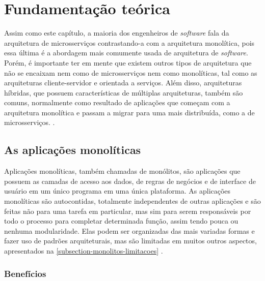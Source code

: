 \chapter{Fundamentação teórica}\label{chapter-fundamentacao}



Assim como este capítulo, a maioria dos engenheiros de \emph{software} fala da arquitetura de microsserviços contrastando-a com a arquitetura monolítica, pois essa última é a abordagem mais comumente usada de arquitetura de \emph{software}. Porém, é importante ter em mente que existem outros tipos de arquitetura que não se encaixam nem como de microsserviços nem como monolíticas, tal como as arquiteturas cliente-servidor e orientada a serviços. Além disso, arquiteturas híbridas, que possuem características de múltiplas arquiteturas, também são comuns, normalmente como resultado de aplicações que começam com a arquitetura monolítica e passam a migrar para uma mais distribuída, como a de microsserviços. \cite{martin-fowler-microservice-tradeoffs}.

\section{As aplicações monolíticas}\label{sessao-monolitos}

Aplicações monolíticas, também chamadas de monólitos, são aplicações que possuem as camadas de acesso aos dados, de regras de negócios e de interface de usuário em um único programa em uma única plataforma. As aplicações monolíticas são autocontidas, totalmente independentes de outras aplicações e são feitas não para uma tarefa em particular, mas sim para serem responsáveis por todo o processo para completar determinada função, assim tendo pouca ou nenhuma modularidade. Elas podem ser organizadas das mais variadas formas e fazer uso de padrões arquiteturais, mas são limitadas em muitos outros aspectos, apresentados na \autoref{subsection-monolitos-limitacoes} \cite{wiki_monolithic_2022}.

\subsection{Benefícios}


